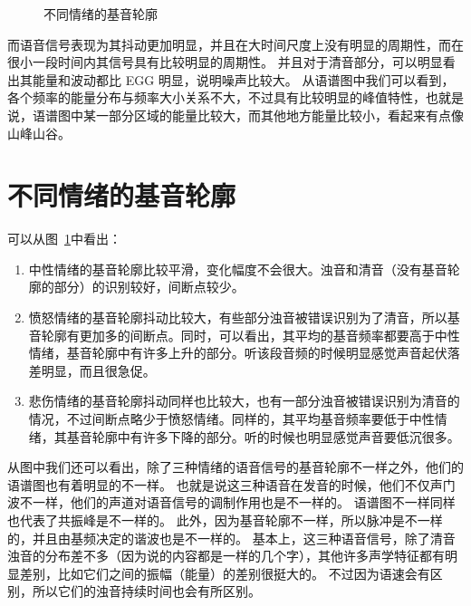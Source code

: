 \begin{figure}[htp]
  \begin{center}


  \end{center}
  \caption{不同情绪的基音轮廓}
  \label{fig:emotion}
\end{figure}

而语音信号表现为其抖动更加明显，并且在大时间尺度上没有明显的周期性，而在很小一段时间内其信号具有比较明显的周期性。
并且对于清音部分，可以明显看出其能量和波动都比 EGG 明显，说明噪声比较大。
从语谱图中我们可以看到，各个频率的能量分布与频率大小关系不大，不过具有比较明显的峰值特性，也就是说，语谱图中某一部分区域的能量比较大，而其他地方能量比较小，看起来有点像山峰山谷。

\section{不同情绪的基音轮廓}
可以从图~\ref{fig:emotion}中看出：

\begin{enumerate}
    \item 中性情绪的基音轮廓比较平滑，变化幅度不会很大。浊音和清音（没有基音轮廓的部分）的识别较好，间断点较少。
    \item 愤怒情绪的基音轮廓抖动比较大，有些部分浊音被错误识别为了清音，所以基音轮廓有更加多的间断点。同时，可以看出，其平均的基音频率都要高于中性情绪，基音轮廓中有许多上升的部分。听该段音频的时候明显感觉声音起伏落差明显，而且很急促。
    \item 悲伤情绪的基音轮廓抖动同样也比较大，也有一部分浊音被错误识别为清音的情况，不过间断点略少于愤怒情绪。同样的，其平均基音频率要低于中性情绪，其基音轮廓中有许多下降的部分。听的时候也明显感觉声音要低沉很多。
\end{enumerate}

从图中我们还可以看出，除了三种情绪的语音信号的基音轮廓不一样之外，他们的语谱图也有着明显的不一样。
也就是说这三种语音在发音的时候，他们不仅声门波不一样，他们的声道对语音信号的调制作用也是不一样的。
语谱图不一样同样也代表了共振峰是不一样的。
此外，因为基音轮廓不一样，所以脉冲是不一样的，并且由基频决定的谐波也是不一样的。
基本上，这三种语音信号，除了清音浊音的分布差不多（因为说的内容都是一样的几个字），其他许多声学特征都有明显差别，比如它们之间的振幅（能量）的差别很挺大的。
不过因为语速会有区别，所以它们的浊音持续时间也会有所区别。

